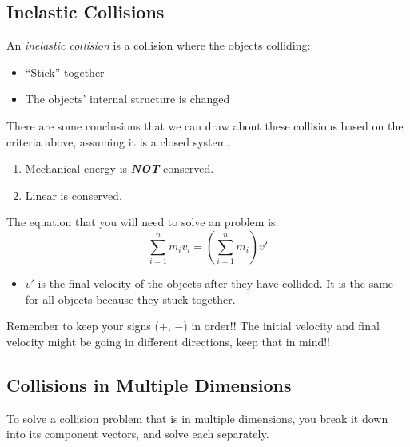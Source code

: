 \subsection{Inelastic Collisions} \label{subsuec:Inelastic Collisions}
\begin{definition} \label{def:Inelastic Collision}
  An \emph{inelastic collision} is a collision where the objects colliding:

  \begin{itemize}[noitemsep, nolistsep]
    \item ``Stick'' together
    \item The objects' internal structure is changed
  \end{itemize}

  There are some conclusions that we can draw about these collisions based on the criteria above, assuming it is a closed system.
  \begin{enumerate}
    \item Mechanical energy is \textbf{\emph{NOT}} conserved.
    \item Linear  is conserved.
  \end{enumerate}

  The equation that you will need to solve an  problem is:
  \begin{equation} \label{eq:Inelastic Collision}
    \sum\limits_{i=1}^{n} m_{i}v_{i} = \left( \sum\limits_{i=1}^{n} m_{i} \right) v'
  \end{equation}

  \begin{itemize}[noitemsep, nolistsep]
    \item $v'$ is the final velocity of the objects after they have collided. It is the same for all objects because they stuck together.
  \end{itemize}

  \begin{remark}
    Remember to keep your signs ($+$, $-$) in order!!
    The initial velocity and final velocity might be going in different directions, keep that in mind!!
  \end{remark}
\end{definition}

\subsection{Collisions in Multiple Dimensions} \label{subsec:Multi-D Collisions}
To solve a collision problem that is in multiple dimensions, you break it down into its component vectors, and solve each separately.

